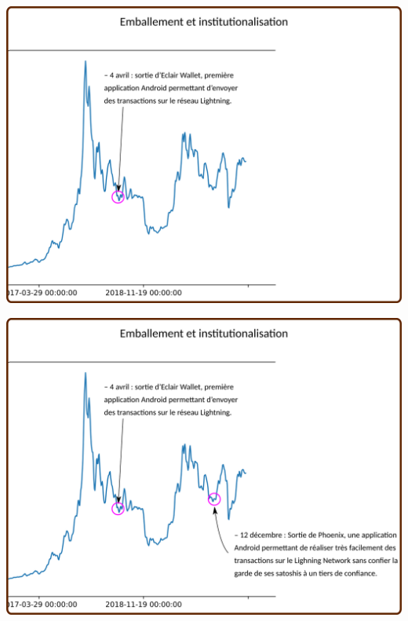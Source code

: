 \documentclass[presentation]{beamer}
\begin{document}
\begin{frame}[label={sec:org2eda74a}]{}
\begin{center}
\includegraphics[width=.95\textwidth]{./Pictures/Timeline/71emballement_lightning.png}
\end{center}
\end{frame}

\begin{frame}[label={sec:org949d556}]{}
\begin{center}
\includegraphics[width=.95\textwidth]{./Pictures/Timeline/72emballement_phoenix.png}
\end{center}
\end{frame}
\end{document}

